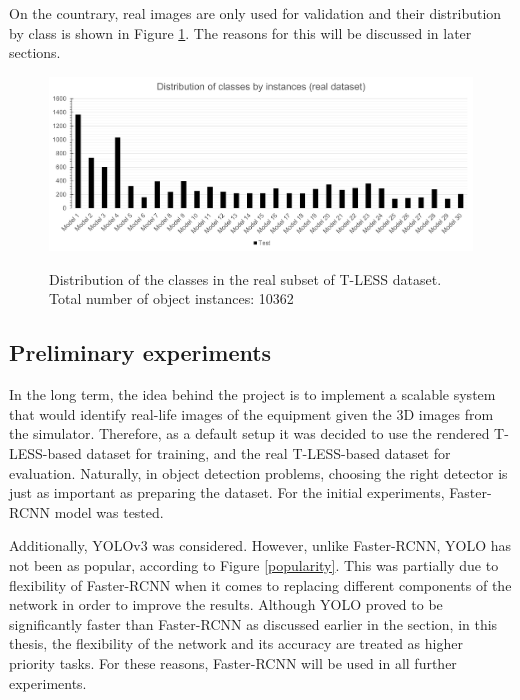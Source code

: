 On the countrary, real images are only used for validation and their distribution by class is shown in Figure \ref{tless_distribution_real}. The reasons for this will be discussed in later sections. 

\begin{figure}[htb]
	\begin{center}
		\includegraphics[width=14cm]{./real_distribution.png}
	\end{center}
	\caption{Distribution of the classes in the real subset of T-LESS dataset. Total number of object instances: 10362}
	\begin{center}
		\label{tless_distribution_real}
	\end{center}
\end{figure}
\FloatBarrier

\subsection{Preliminary experiments}
In the long term, the idea behind the project is to implement a scalable system that would identify real-life images of the equipment given the 3D images from the simulator. Therefore, as a default setup it was decided to use the rendered T-LESS-based dataset for training, and the real T-LESS-based dataset for evaluation. Naturally, in object detection problems, choosing the right detector is just as important as preparing the dataset. For the initial experiments, Faster-RCNN  \cite{Girshick2015} model was tested.

Additionally, YOLOv3 \cite{Redmon2018a} was considered. However, unlike Faster-RCNN, YOLO has not been as popular, according to Figure \ref{popularity}. This was partially due to flexibility of Faster-RCNN when it comes to replacing different components of the network in order to improve the results. Although YOLO proved to be significantly faster than Faster-RCNN as discussed earlier in the  section, in this thesis, the flexibility of the network and its accuracy are treated  as higher priority tasks. For these reasons, Faster-RCNN will be used in all further experiments.  
   

